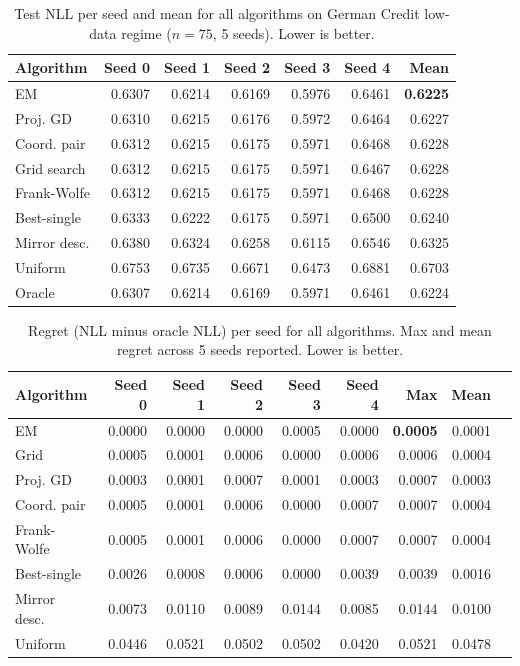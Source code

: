 \begin{table}[h]
\centering
\caption{Test NLL per seed and mean for all 
algorithms on German Credit low-data regime 
($n = 75$, 5 seeds). Lower is better.}
\label{tab:german_low_nll}
{\singlespacing
\begin{tabular}{lrrrrrr}
\hline
Algorithm & Seed 0 & Seed 1 & Seed 2 
& Seed 3 & Seed 4 & Mean \\
\hline
EM          & 0.6307 & 0.6214 & 0.6169 
             & 0.5976 & 0.6461 & \textbf{0.6225} \\
Proj. GD    & 0.6310 & 0.6215 & 0.6176 
             & 0.5972 & 0.6464 & 0.6227 \\
Coord. pair & 0.6312 & 0.6215 & 0.6175 
             & 0.5971 & 0.6468 & 0.6228 \\
Grid search & 0.6312 & 0.6215 & 0.6175 
             & 0.5971 & 0.6467 & 0.6228 \\
Frank-Wolfe & 0.6312 & 0.6215 & 0.6175 
             & 0.5971 & 0.6468 & 0.6228 \\
Best-single & 0.6333 & 0.6222 & 0.6175 
             & 0.5971 & 0.6500 & 0.6240 \\
Mirror desc.& 0.6380 & 0.6324 & 0.6258 
             & 0.6115 & 0.6546 & 0.6325 \\
Uniform     & 0.6753 & 0.6735 & 0.6671 
             & 0.6473 & 0.6881 & 0.6703 \\
\hline
Oracle      & 0.6307 & 0.6214 & 0.6169 
             & 0.5971 & 0.6461 & 0.6224 \\
\hline
\end{tabular}}
\end{table}

\begin{table}[h]
\centering
\caption{Regret (NLL minus oracle NLL) per 
seed for all algorithms. Max and mean regret 
across 5 seeds reported. Lower is better.}
\label{tab:german_low_regret}
{\singlespacing
\begin{tabular}{lrrrrrrrr}
\hline
Algorithm & Seed 0 & Seed 1 & Seed 2 
& Seed 3 & Seed 4 & Max & Mean \\
\hline
EM          & 0.0000 & 0.0000 & 0.0000 
             & 0.0005 & 0.0000 & \textbf{0.0005} & 0.0001 \\
Grid        & 0.0005 & 0.0001 & 0.0006 
             & 0.0000 & 0.0006 & 0.0006 & 0.0004 \\
Proj. GD    & 0.0003 & 0.0001 & 0.0007 
             & 0.0001 & 0.0003 & 0.0007 & 0.0003 \\
Coord. pair & 0.0005 & 0.0001 & 0.0006 
             & 0.0000 & 0.0007 & 0.0007 & 0.0004 \\
Frank-Wolfe & 0.0005 & 0.0001 & 0.0006 
             & 0.0000 & 0.0007 & 0.0007 & 0.0004 \\
Best-single & 0.0026 & 0.0008 & 0.0006 
             & 0.0000 & 0.0039 & 0.0039 & 0.0016 \\
Mirror desc.& 0.0073 & 0.0110 & 0.0089 
             & 0.0144 & 0.0085 & 0.0144 & 0.0100 \\
Uniform     & 0.0446 & 0.0521 & 0.0502 
             & 0.0502 & 0.0420 & 0.0521 & 0.0478 \\
\hline
\end{tabular}}
\end{table}

